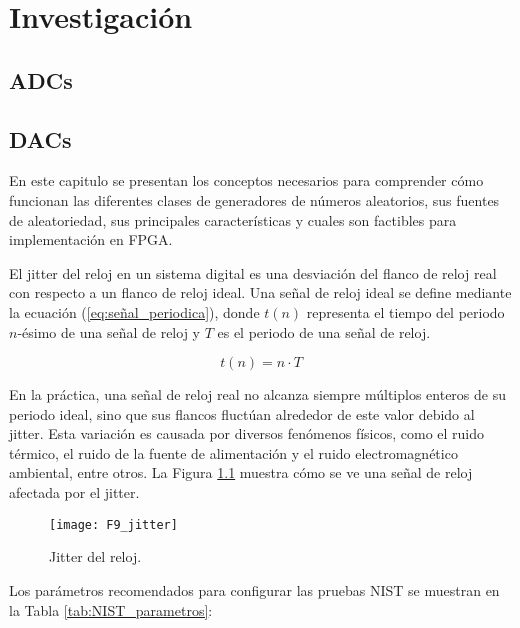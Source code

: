 \chapter{Investigación}

	\section{ADCs}
	
	
	\section{DACs}
	

    En este capitulo se presentan los conceptos necesarios para comprender cómo funcionan las diferentes clases de generadores de números aleatorios, sus fuentes de aleatoriedad, sus principales características y cuales son factibles para implementación en FPGA.


El jitter del reloj en un sistema digital es una desviación del flanco de reloj real con respecto a un flanco de reloj ideal. Una señal de reloj ideal se define mediante la ecuación (\ref{eq:señal_periodica}), donde $t(n)$ representa el tiempo del periodo $n$-ésimo de una señal de reloj y $T$ es el periodo de una señal de reloj.

            \begin{equation}
                t(n) = n \cdot T 
                \label{eq:señal_periodica}
            \end{equation}
            
            En la práctica, una señal de reloj real no alcanza siempre múltiplos enteros de su periodo ideal, sino que sus flancos fluctúan alrededor de este valor debido al jitter. Esta variación es causada por diversos fenómenos físicos, como el ruido térmico, el ruido de la fuente de alimentación y el ruido electromagnético ambiental, entre otros. La Figura \ref{fig:F9_jitter} muestra cómo se ve una señal de reloj afectada por el jitter.

            \begin{figure}[hbtp]
                \centering
                \texttt{[image: F9\_jitter]}
                \caption{Jitter del reloj.}
                \label{fig:F9_jitter}
            \end{figure}
            
            
            Los parámetros recomendados para configurar las pruebas NIST se muestran en la Tabla \ref{tab:NIST_parametros}:


